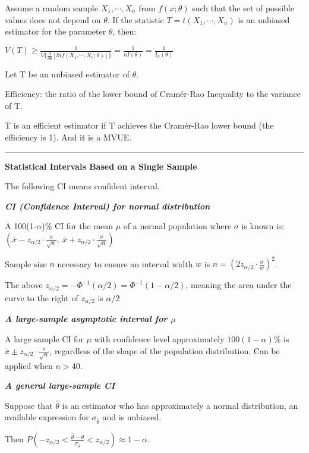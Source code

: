 \documentclass{article}
\newcommand{\sectionline}{\color{black}\rule[2pt]{0.45\textwidth}{0.05em}\color{black}}
\newcommand{\bigtitle}[1]{
	\noindent
	\textbf{#1}
}
\newcommand{\smalltitle}[1]{
	\noindent
	\textbf{\textit{#1}}
}
\newcommand{\properframed}[1]{
	{
		\centering
		\vspace{-2 ex}
		\begin{framed}
			\vspace{-1.5 ex}
			#1
			\vspace{-1.5 ex}
		\end{framed}
		\vspace{-2 ex}
	}
}
\begin{document}
	Assume a random sample $X_1,\cdots,X_n$ from $f(x;\theta)$ such that the set of possible values does not depend on $\theta$. If the statistic $T = t(X_1,\cdots,X_n)$ is an unbiased estimator for the parameter $\theta$, then:
	
	$V(T)\geq \frac{1}{V \lbrace \frac{\partial}{\partial\theta}\left[lnf(X_1,\cdots,X_n;\theta)\right] \rbrace } = \frac{1}{nI(\theta)} = \frac{1}{I_n(\theta)}$
	
	Let T be an unbiased estimator of $\theta$.
	
	Efficiency: the ratio of the lower bound of Cram\'{e}r-Rao Inequality to the variance of T.
	
	T is an efficient estimator if T achieves the Cram\'{e}r-Rao lower bound (the efficiency is 1). And it is a MVUE. 
	
	\sectionline
	
	\bigtitle{Statistical Intervals Based on a Single Sample}
	
	The following CI means confident interval.
	
	\smalltitle{CI (Confidence Interval) for normal distribution}
	
	A 100(1-$\alpha$)\% CI for the mean $\mu$ of a normal population where $\sigma$ is known is:
	$\left(\overline{x}-z_{\alpha/2} \cdot \frac{\sigma}{\sqrt{n}}, \: \overline{x}+z_{\alpha/2}\cdot \frac{\sigma}{\sqrt{n}} \right)$
	
	Sample size $n$ necessary to ensure an interval width $w$ is $n=(2z_{\alpha/2}\cdot \frac{\sigma}{w})^2$. 
	
	\properframed{
		The above $z_{\alpha/2} = - \Phi^{-1}(\alpha/2) = \Phi^{-1}(1-\alpha / 2)$, meaning the area under the curve to the right of $z_{\alpha/2}$ is $\alpha/2$
	}
	
	\smalltitle{A large-sample asymptotic interval for $\mu$}
	
	A large sample CI for $\mu$ with confidence level approximately $100(1-\alpha)\%$ is $\overline { x } \pm z _ { \alpha / 2 } \cdot \frac { s } { \sqrt { n } }$, regardless of the shape of the population distribution. Can be applied when $n>40$.
	
	\smalltitle{A general large-sample CI}
	
	Suppose that $\hat{\theta}$ is an estimator who has approximately a normal distribution, an available expression for $\sigma_{\hat{\theta}}$ and is unbiased. 
	
	Then $P \left( - z _ { \alpha / 2 } < \frac { \hat { \theta } - \theta } { \sigma _ { \hat { \theta } } } < z _ { \alpha / 2 } \right) \approx 1 - \alpha$.
	
\end{document}
